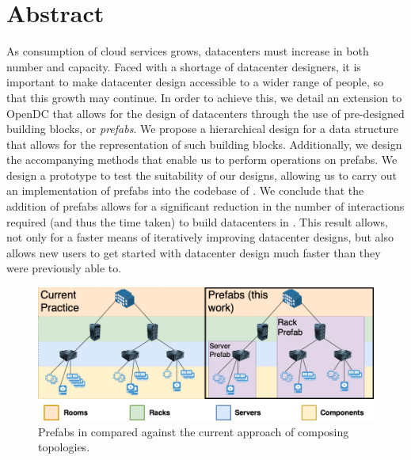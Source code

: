 \documentclass[11pt]{article}
\begin{document}
\newpage


\setcounter{tocdepth}{2}
\tableofcontents
\newpage
\listoffigures
\listoftables
\newpage


\section*{Abstract}
As consumption of cloud services grows, datacenters must increase in both number and capacity. 
Faced with a shortage of datacenter designers, it is important to make datacenter design accessible to a wider range of people, so that this growth may continue. 
In order to achieve this, we detail an extension to OpenDC that allows for the design of datacenters through the use of pre-designed building blocks, or \textit{prefabs}. 
We propose a hierarchical design for a data structure that allows for the representation of such building blocks.
Additionally, we design the accompanying methods that enable us to perform operations on prefabs. 
We design a prototype to test the suitability of our designs, allowing us to carry out an implementation of prefabs into the codebase of \opendc{}. 
We conclude that the addition of prefabs allows for a significant reduction in the number of interactions required (and thus the time taken) to build datacenters in \opendc{}. 
This result allows, not only for a faster means of iteratively improving datacenter designs, but also allows new users to get started with datacenter design much faster than they were previously able to.
\newpage

\begin{figure}
	\centering
	\includegraphics[width=\textwidth]{thesis_header.png}
	\caption[Prefabs in \opendc{} compared against the current approach of composing topologies]{Prefabs in \opendc{} compared against the current approach of composing topologies.}
	\label{fig:prefabsheader}
\end{figure}
\end{document}
